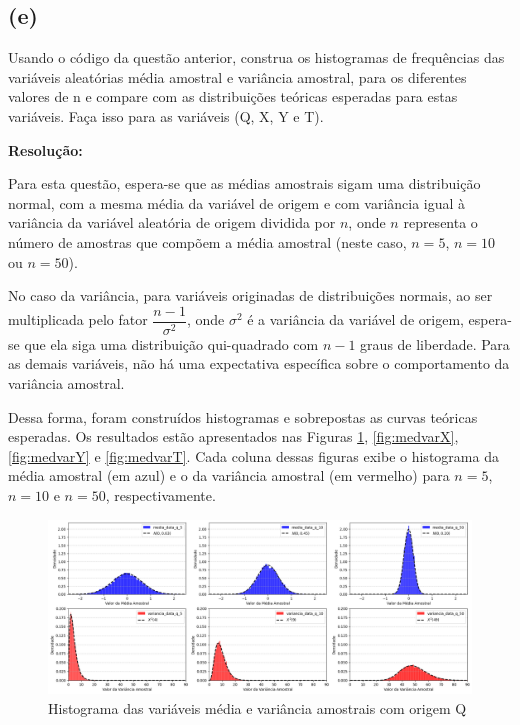 \documentclass[a4paper, 11pt]{article}
\begin{document}
\subsection{\textbf{(e)}}

\noindent Usando o código da questão anterior, construa os histogramas de frequências das
variáveis aleatórias média amostral e variância amostral, para os diferentes valores de n e compare com as distribuições teóricas esperadas para estas variáveis.
Faça isso para as variáveis (Q, X, Y e T).

\textbf{Resolução:}

Para esta questão, espera-se que as médias amostrais sigam uma distribuição normal, com a mesma média da variável de origem e com variância igual à variância da variável aleatória de origem dividida por \( n \), onde \( n \) representa o número de amostras que compõem a média amostral (neste caso, \( n = 5 \), \( n = 10 \) ou \( n = 50 \)). 

No caso da variância, para variáveis originadas de distribuições normais, ao ser multiplicada pelo fator $\dfrac{n-1}{\sigma^2}$, onde $\sigma^2$ é a variância da variável de origem, espera-se que ela siga uma distribuição qui-quadrado com \( n - 1 \) graus de liberdade. Para as demais variáveis, não há uma expectativa específica sobre o comportamento da variância amostral.

Dessa forma, foram construídos histogramas e sobrepostas as curvas teóricas esperadas. Os resultados estão apresentados nas Figuras \ref{fig:medvarQ}, \ref{fig:medvarX}, \ref{fig:medvarY} e \ref{fig:medvarT}. Cada coluna dessas figuras exibe o histograma da média amostral (em azul) e o da variância amostral (em vermelho) para \( n = 5 \), \( n = 10 \) e \( n = 50 \), respectivamente.

\begin{figure}[H]
    \centering 
    \includegraphics[width=1\textwidth]{imgs/medvarQ.png}
    \caption{Histograma das variáveis média e variância amostrais com origem Q}
    \label{fig:medvarQ} %
\end{figure}
\end{document}
